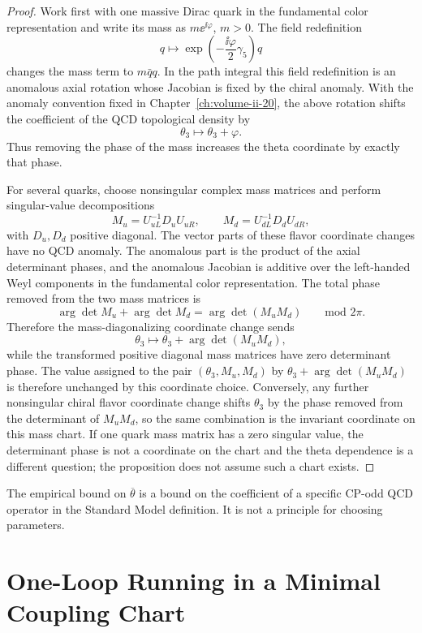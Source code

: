 \begin{proof}
Work first with one massive Dirac quark in the fundamental color
representation and write its mass as \(m\ee^{\ii\varphi}\), \(m>0\).  The
field redefinition
\[
  q\longmapsto \exp\!\left(-\frac{\ii\varphi}{2}\gamma_5\right)q
\]
changes the mass term to \(m\bar q q\).  In the path integral this field
redefinition is an anomalous axial rotation whose Jacobian is fixed by the
chiral anomaly.  With the anomaly convention fixed in
Chapter~\ref{ch:volume-ii-20},
the above rotation shifts the coefficient of the QCD topological density by
\[
  \theta_3\longmapsto \theta_3+\varphi .
\]
Thus removing the phase of the mass increases the theta coordinate by exactly
that phase.

For several quarks, choose nonsingular complex mass matrices and perform
singular-value decompositions
\[
  M_u=U_{uL}^{-1}D_uU_{uR},
  \qquad
  M_d=U_{dL}^{-1}D_dU_{dR},
\]
with \(D_u,D_d\) positive diagonal.  The vector parts of these flavor
coordinate changes have no QCD anomaly.  The anomalous part is the product of
the axial determinant phases, and the anomalous Jacobian is additive over the
left-handed Weyl components in the fundamental color representation.  The
total phase removed from the two mass matrices is
\[
  \arg\det M_u+\arg\det M_d=\arg\det(M_uM_d)
  \qquad \text{mod }2\pi .
\]
Therefore the mass-diagonalizing coordinate change sends
\[
  \theta_3\longmapsto \theta_3+\arg\det(M_uM_d),
\]
while the transformed positive diagonal mass matrices have zero determinant
phase.  The value assigned to the pair \((\theta_3,M_u,M_d)\) by
\(\theta_3+\arg\det(M_uM_d)\) is therefore unchanged by this coordinate
choice.  Conversely, any further nonsingular chiral flavor coordinate change
shifts \(\theta_3\) by the phase removed from the determinant of
\(M_uM_d\), so the same combination is the invariant coordinate on this mass
chart.  If one quark mass matrix has a zero singular value, the determinant
phase is not a coordinate on the chart and the theta dependence is a different
question; the proposition does not assume such a chart exists.
\end{proof}

The empirical bound on \(\overline\theta\) is a bound on the coefficient of a
specific CP-odd QCD operator in the Standard Model definition.  It is not a
principle for choosing parameters.

\section{One-Loop Running in a Minimal Coupling Chart}

